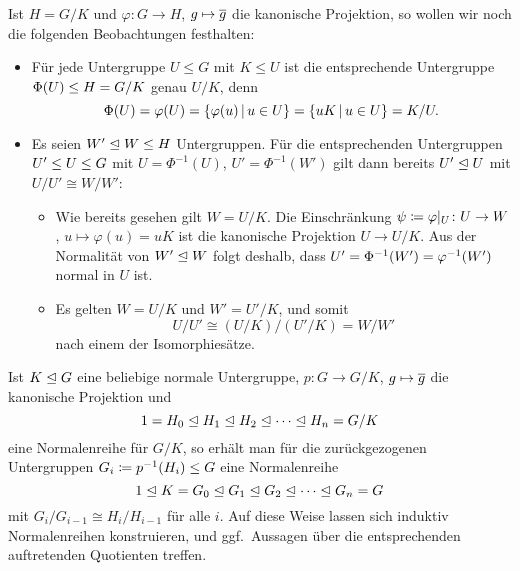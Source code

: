 \begin{remark}
  Ist $H = G/K$ und $\varphi \colon G \to H$, $g \mapsto \overline{g}$ die kanonische Projektion, so wollen wir noch die folgenden Beobachtungen festhalten:
  \begin{itemize}
    \item
      Für jede Untergruppe $U \leq G$ mit $K \leq U$ ist die entsprechende Untergruppe $\Phi(U) \leq H = G/K$ genau $U/K$, denn
      \[
          \Phi(U)
        = \varphi(U)
        = \{ \varphi(u) \suchthat u \in U \}
        = \{ uK \suchthat u \in U \}
        = K/U.
      \]
    \item
      Es seien $W' \trianglelefteq W \leq H$ Untergruppen.
      Für die entsprechenden Untergruppen $U' \leq U \leq G$ mit $U = \Phi^{-1}(U)$, $U' = \Phi^{-1}(W')$ gilt dann bereits $U' \trianglelefteq U$ mit $U/U' \cong W/W'$:
      \begin{itemize}
        \item
          Wie bereits gesehen gilt $W = U/K$.
          Die Einschränkung $\psi \coloneqq \restrict{\varphi}{U} \colon U \to W$, $u \mapsto \varphi(u) = uK$ ist die kanonische Projektion $U \to U/K$.
          Aus der Normalität von $W' \trianglelefteq W$ folgt deshalb, dass $U' = \Phi^{-1}(W') = \varphi^{-1}(W')$ normal in $U$ ist.
        \item
          Es gelten $W = U/K$ und $W' = U'/K$, und somit
          \[
                  U/U'
            \cong (U/K) / (U'/K)
            =     W/W'
          \]
          nach einem der Isomorphiesätze.
      \end{itemize}
  \end{itemize}
\end{remark}

\begin{example}
  Ist $K \trianglelefteq G$ eine beliebige normale Untergruppe, $p \colon G \to G/K$, $g \mapsto \overline{g}$ die kanonische Projektion und
  \[
                1
    =           H_0
    \trianglelefteq  H_1
    \trianglelefteq  H_2
    \trianglelefteq  \dotsb
    \trianglelefteq  H_n
    =           G/K
  \]
  eine Normalenreihe für $G/K$, so erhält man für die zurückgezogenen Untergruppen $G_i \coloneqq p^{-1}(H_i) \leq G$ eine Normalenreihe
  \[
                1
    \trianglelefteq  K
    =           G_0
    \trianglelefteq  G_1
    \trianglelefteq  G_2
    \trianglelefteq  \dotsb
    \trianglelefteq  G_n
    =           G
  \]
  mit $G_i/G_{i-1} \cong H_i/H_{i-1}$ für alle $i$.
  Auf diese Weise lassen sich induktiv Normalenreihen konstruieren, und ggf.\ Aussagen über die entsprechenden auftretenden Quotienten treffen.
\end{example}





